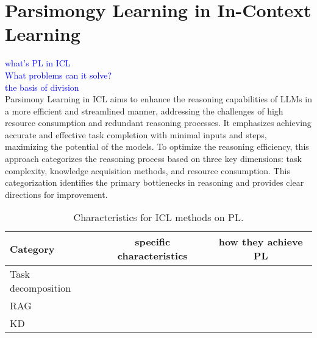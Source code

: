 \section{Parsimongy Learning in In-Context Learning}
\textcolor{blue}{what's PL in ICL}\\
\textcolor{blue}{What problems can it solve?}\\
\textcolor{blue}{the basis of division}\\
Parsimony Learning in ICL aims to enhance the reasoning capabilities of LLMs in a more efficient and streamlined manner, addressing the challenges of high resource consumption and redundant reasoning processes. It emphasizes achieving accurate and effective task completion with minimal inputs and steps, maximizing the potential of the models. To optimize the reasoning efficiency, this approach categorizes the reasoning process based on three key dimensions: task complexity, knowledge acquisition methods, and resource consumption. This categorization identifies the primary bottlenecks in reasoning and provides clear directions for improvement.

\begin{table}[t]
\footnotesize
\centering
\tabcolsep=2pt
\caption{Characteristics for ICL methods on PL.}
\begin{tabular}{l|c|c}
\toprule
Category &specific characteristics &how they achieve PL \\
\midrule
Task decomposition & &\\
\midrule
RAG & & \\
\midrule
KD & &\\
\bottomrule
\end{tabular}
\label{table4}
\end{table}

